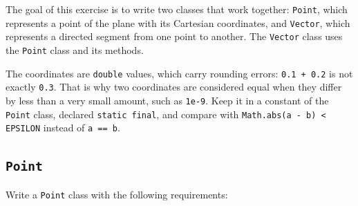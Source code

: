 The goal of this exercise is to write two classes that work together: \texttt{Point}, which represents a point of the plane with its Cartesian coordinates, and \texttt{Vector}, which represents a directed segment from one point to another. The \texttt{Vector} class uses the \texttt{Point} class and its methods.

The coordinates are \texttt{double} values, which carry rounding errors: \texttt{0.1 + 0.2} is not exactly \texttt{0.3}. That is why two coordinates are considered equal when they differ by less than a very small amount, such as \texttt{1e-9}. Keep it in a constant of the \texttt{Point} class, declared \texttt{static final}, and compare with \texttt{Math.abs(a - b) \textless{} EPSILON} instead of \texttt{a == b}.

\subsection{\texttt{Point}}

Write a \texttt{Point} class with the following requirements:

